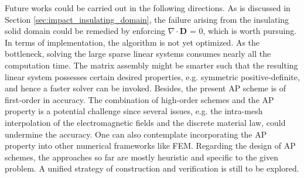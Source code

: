\documentclass{report}
\begin{document}
Future works could be carried out in the following directions. As is discussed in Section \ref{sec:impact_insulating_domain}, the failure arising from the insulating solid domain could be remedied by enforcing $\nabla \cdot \mathbf{D}$ = 0, which is worth pursuing. In terms of implementation, the algorithm is not yet optimized. As the bottleneck, solving the large sparse linear systems consumes nearly all the computation time. The matrix assembly might be smarter such that the resulting linear system possesses certain desired properties, e.g. symmetric positive-definite, and hence a faster solver can be invoked. Besides, the present AP scheme is of first-order in accuracy. The combination of high-order schemes and the AP property is a potential challenge since several issues, e.g. the intra-mesh interpolation of the electromagnetic fields and the discrete material law, could undermine the accuracy. One can also contemplate incorporating the AP property into other numerical frameworks like FEM. Regarding the design of AP schemes, the approaches so far are mostly heuristic and specific to the given problem. A unified strategy of construction and verification is still to be explored.
\end{document}
